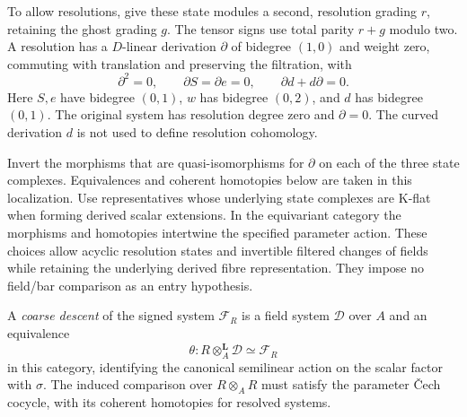 To allow resolutions, give these state modules a second, resolution
grading $r$, retaining the ghost grading $g$. The tensor signs use
total parity $r+g$ modulo two. A resolution has a $D$-linear
derivation $\partial$ of bidegree $(1,0)$ and weight zero,
commuting with translation and preserving the filtration, with
\[
 \partial^2=0,\qquad \partial S=\partial e=0,
 \qquad \partial d+d\partial=0.
\]
Here $S,e$ have bidegree $(0,1)$, $w$ has bidegree $(0,2)$,
and $d$ has bidegree $(0,1)$. The original system has resolution
degree zero and $\partial=0$. The curved derivation $d$ is not
used to define resolution cohomology.

Invert the morphisms that are quasi-isomorphisms for $\partial$
on each of the three state complexes. Equivalences and coherent
homotopies below are taken in this localization. Use representatives
whose underlying state complexes are K-flat when forming derived
scalar extensions. In the equivariant category the morphisms and
homotopies intertwine the specified parameter action. These choices
allow acyclic resolution states and invertible filtered changes of
fields while retaining the underlying derived fibre representation.
They impose no field/bar comparison as an entry hypothesis.

\begin{definition}\label{rpd:def:descent}
A \emph{coarse descent} of the signed system $\mathcal F_R$ is a
field system $\mathcal D$ over $A$ and an equivalence
\[
 \theta:R\otimes_A^{\mathbf L}\mathcal D\simeq\mathcal F_R
\]
in this category, identifying the canonical semilinear action on the
scalar factor with $\sigma$. The induced comparison over
$R\otimes_A R$ must satisfy the parameter \v{C}ech cocycle, with
its coherent homotopies for resolved systems.
\end{definition}

